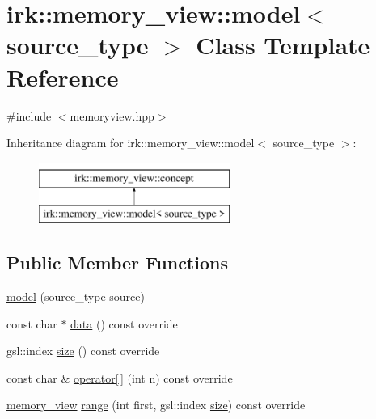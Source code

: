\hypertarget{classirk_1_1memory__view_1_1model}{}\section{irk\+:\+:memory\+\_\+view\+:\+:model$<$ source\+\_\+type $>$ Class Template Reference}
\label{classirk_1_1memory__view_1_1model}


{\ttfamily \#include $<$memoryview.\+hpp$>$}

Inheritance diagram for irk\+:\+:memory\+\_\+view\+:\+:model$<$ source\+\_\+type $>$\+:\begin{figure}[H]
\begin{center}
\leavevmode
\includegraphics[height=2.000000cm]{classirk_1_1memory__view_1_1model}
\end{center}
\end{figure}
\subsection*{Public Member Functions}
\begin{DoxyCompactItemize}
\item 
\mbox{\hyperlink{classirk_1_1memory__view_1_1model_a47843c84f96ecb25ce8c81ce47c214b4}{model}} (source\+\_\+type source)
\item 
const char $\ast$ \mbox{\hyperlink{classirk_1_1memory__view_1_1model_a5a7c432c460f99bd8b78c29ef6d44009}{data}} () const override
\item 
gsl\+::index \mbox{\hyperlink{classirk_1_1memory__view_1_1model_a88bdaaf00f71b733bb67ea912ed78251}{size}} () const override
\item 
const char \& \mbox{\hyperlink{classirk_1_1memory__view_1_1model_aa1e6d7c44b66f54ee9c94abeba0449c2}{operator\mbox{[}$\,$\mbox{]}}} (int n) const override
\item 
\mbox{\hyperlink{classirk_1_1memory__view}{memory\+\_\+view}} \mbox{\hyperlink{classirk_1_1memory__view_1_1model_ab1332728617a8e4a8f719c6fe380e100}{range}} (int first, gsl\+::index \mbox{\hyperlink{classirk_1_1memory__view_1_1model_a88bdaaf00f71b733bb67ea912ed78251}{size}}) const override
\end{DoxyCompactItemize}


